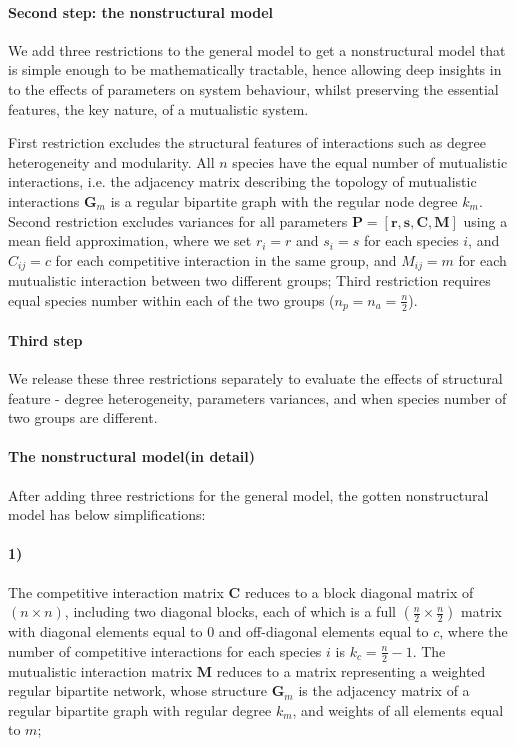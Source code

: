 \documentclass[a4paper,fleqn,12pt]{article}
\begin{document}
\paragraph*{Second step: the nonstructural model} 
We add three restrictions to the general model to get a nonstructural model that is simple enough to be mathematically tractable, hence allowing deep insights in to the effects of parameters on system behaviour, whilst preserving the essential features, the key nature, of a mutualistic system.

First restriction excludes the structural features of interactions such as degree heterogeneity and modularity.
All $n$ species have the equal number of mutualistic interactions, i.e. the adjacency matrix describing the topology of mutualistic interactions $\mathbf{G}_m$ is a regular bipartite graph with the regular node degree $k_m$.
Second restriction excludes variances for all parameters $\mathbf{P} = [\mathbf{r}, \mathbf{s}, \mathbf{C}, \mathbf{M}]$ using a mean field approximation\cite{bastolla_architecture_2009,saavedra_estimating_2013,rohr_structural_2014},
where we set $r_i = r$ and $s_i = s$ for each species $i$, 
and $C_{ij} = c$ for each competitive interaction in the same group,
and $M_{ij} = m$ for each mutualistic interaction between two different groups;
Third restriction requires equal species number within each of the two groups ($n_p = n_a = \frac{n}{2}$).

\paragraph*{Third step} 
We release these three restrictions separately to evaluate the effects of structural feature - degree heterogeneity, parameters variances, and when species number of two groups are different.

\paragraph*{The nonstructural model(in detail)} 
After adding three restrictions for the general model, the gotten nonstructural model has below simplifications:

\paragraph*{1)} The competitive interaction matrix $\mathbf{C}$ reduces to a block diagonal matrix of $(n \times n)$, including two diagonal blocks, each of which is a full $(\frac{n}{2} \times \frac{n}{2})$ matrix with diagonal elements equal to $0$ and off-diagonal elements equal to $c$, where the number of competitive interactions for each species $i$ is $k_c = \frac{n}{2}-1$.
The mutualistic interaction matrix $\mathbf{M}$ reduces to a matrix representing a weighted regular bipartite network, whose structure $\mathbf{G}_m$ is the adjacency matrix of a regular bipartite graph with regular degree $k_m$, and weights of all elements equal to $m$;
\end{document}
